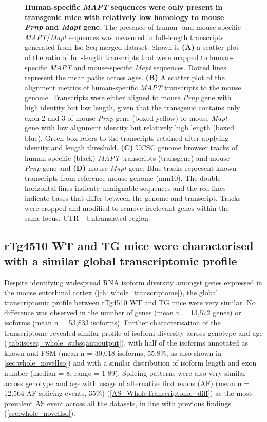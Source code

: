 \begin{figure}[htp]
	{\textbf{Human-specific \textit{MAPT} sequences were only present in transgenic mice with relatively low homology to mouse \textit{Prnp} and \textit{Mapt} gene.} The presence of human- and mouse-specific \textit{MAPT}/\textit{Mapt} sequences was measured in full-length transcripts generated from Iso-Seq merged dataset. Shown is \textbf{(A)} a scatter plot of the ratio of full-length transcripts that were mapped to human-specific \textit{MAPT} and mouse-specific \textit{Mapt} sequences. Dotted lines represent the mean paths across ages. \textbf{(B)} A scatter plot of the alignment metrics of human-specific \textit{MAPT} transcripts to the mouse genome. Transcripts were either aligned to mouse \textit{Prnp} gene with high identity but low length, given that the transgenic contains only exon 2 and 3 of mouse \textit{Prnp} gene\cite{Ramsden2005} (boxed yellow) or mouse \textit{Mapt} gene with low alignment identity but relatively high length (boxed blue). Green box refers to the transcripts retained after applying identity and length threshold. \textbf{(C)} UCSC genome browser tracks of human-specific (black) \textit{MAPT} transcripts (transgene) and mouse \textit{Prnp} gene and \textbf{(D)} mouse \textit{Mapt} gene. Blue tracks represent known transcripts from reference mouse genome (mm10). The double horizontal lines indicate unalignable sequences and the red lines indicate bases that differ between the genome and transcript. Tracks were cropped and modified to remove irrelevant genes within the same locus. UTR - Untranslated region.}
	\label{fig:isoseq_humanmapt}
\end{figure}

\clearpage
\subsection{rTg4510 WT and TG mice were characterised with a similar global transcriptomic profile}
\label{ch4: mice_AS_events}
Despite identifying widespread RNA isoform diversity amongst genes expressed in the mouse entorhinal cortex (\cref{ch: whole_transcriptome}), the global transcriptomic profile between rTg4510 WT and TG mice were very similar. No difference was observed in the number of genes (mean n = 13,572 genes) or isoforms (mean n = 53,833 isoforms). Further characterisation of the transcriptome revealed similar profile of isoform diversity across genotype and age (\cref{tab:isoseq_whole_subsqantioutput}), with half of the isoforms annotated as known and FSM (mean n = 30,018 isoforms, 55.8\%, as also shown in \cref{sec:whole_novelIso}) and with a similar distribution of isoform length and exon number (median = 8, range = 1-89). Splicing patterns were also very similar across genotype and age with usage of alternative first exons (AF) (mean n = 12,564 AF splicing events, 35\%) (\cref{AS_WholeTranscriptome_diff}) as the most prevalent AS event across all the datasets, in line with previous findings (\cref{sec:whole_novelIso}).

